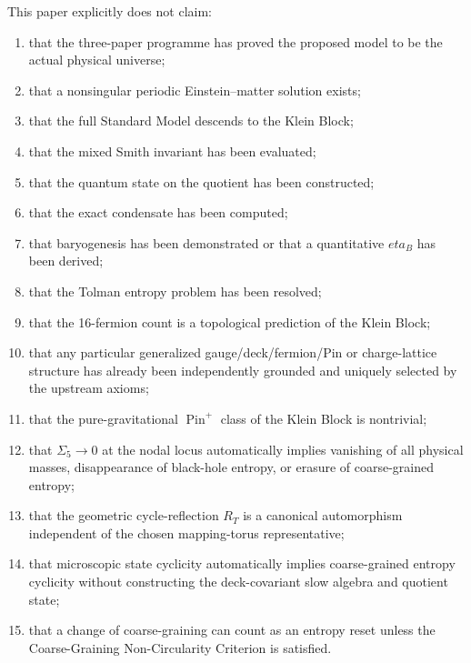 \documentclass[11pt]{article}
\theoremstyle{canonmath}
\theoremstyle{canonpostulate}
\theoremstyle{canonclaim}
\providecommand{\Pin}{\operatorname{Pin}}
\def\eta{eta}%
\begin{document}
\begin{excludedclaims}
This paper explicitly does not claim:
\begin{enumerate}
\item that the three-paper programme has proved the proposed model to be the actual physical universe;
\item that a nonsingular periodic Einstein--matter solution exists;
\item that the full Standard Model descends to the Klein Block;
\item that the mixed Smith invariant has been evaluated;
\item that the quantum state on the quotient has been constructed;
\item that the exact condensate has been computed;
\item that baryogenesis has been demonstrated or that a quantitative $\eta_B$ has been derived;
\item that the Tolman entropy problem has been resolved;
\item that the 16-fermion count is a topological prediction of the Klein Block;
\item that any particular generalized gauge/deck/fermion/Pin or charge-lattice structure has already been independently grounded and uniquely selected by the upstream axioms;
\item that the pure-gravitational $\Pin^+$ class of the Klein Block is nontrivial;
\item that $\Sigma_5\to0$ at the nodal locus automatically implies vanishing of all physical masses, disappearance of black-hole entropy, or erasure of coarse-grained entropy;
\item that the geometric cycle-reflection $R_T$ is a canonical automorphism independent of the chosen mapping-torus representative;
\item that microscopic state cyclicity automatically implies coarse-grained entropy cyclicity without constructing the deck-covariant slow algebra and quotient state;
\item that a change of coarse-graining can count as an entropy reset unless the Coarse-Graining Non-Circularity Criterion is satisfied.
\end{enumerate}
\end{excludedclaims}

\newpage
\appendix
\end{document}
